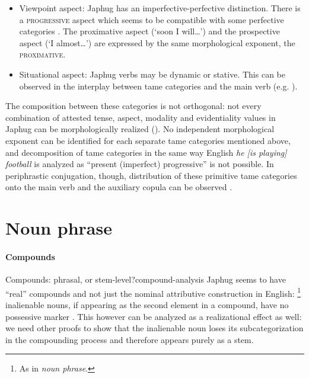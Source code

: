 \documentclass[a4paper, oneside, 12pt]{report}
\newcommand*{\citetable}[1]{Table~{#1}}
\newcommand*{\citepage}[1]{p.~{#1}}
\newcommand{\form}[1]{\emph{#1}}
\newcommand{\category}[1]{\textsc{#1}}
\newcommand{\translate}[1]{`#1'}
\begin{document}
\begin{table}[H]
\begin{itemize}
        \item Viewpoint aspect: Japhug has an imperfective-perfective distinction.
        There is a \category{progressive} aspect 
        which seems to be compatible with some perfective categories
        \citep[\citetable{21.8}]{jacques2021grammar}. 
        The proximative aspect (\translate{soon I will\dots})
        and the prospective aspect (\translate{I almost\dots})
        are expressed by the same morphological exponent, the \category{proximative}.
            
        \item Situational aspect:
        Japhug verbs may be dynamic or stative. 
        This can be observed in the interplay between \ac{tame} categories
        and the main verb (e.g. \citealt[\citepage{1102}]{jacques2021grammar}).
    \end{itemize}
\end{table}

The composition between these categories is not orthogonal:
not every combination of attested tense, aspect, modality and evidentiality values in Japhug 
can be morphologically realized
().
No independent morphological exponent can be identified for 
each separate \acs{tame} categories mentioned above,
and decomposition of \acs{tame} categories 
in the same way English \form{he [is playing] football} 
is analyzed as ``present (imperfect) progressive'' is not possible. 
In periphrastic conjugation, though, 
distribution of these primitive \acs{tame} categories 
onto the main verb and the auxiliary copula 
can be observed \citep[\citepage{1089}, (7)]{jacques2021grammar}.

\section{Noun phrase}

\paragraph*{Compounds} 

\begin{todobox}{Compounds: phrasal, or stem-level?}{compound-analysis}
    Japhug seems to have ``real'' compounds and not just
    the nominal attributive construction in English:%
    \footnote{
        As in \form{noun phrase}.
    }
    inalienable nouns, if appearing as the second element in a compound,
    have no possessive marker \citep[\citepage{15}]{jacques2021grammar}. 
    This however can be analyzed as a realizational effect as well:
    we need other proofs to show that the inalienable noun 
    loses its subcategorization in the compounding process
    and therefore appears purely as a stem.
\end{todobox}
\end{document}
